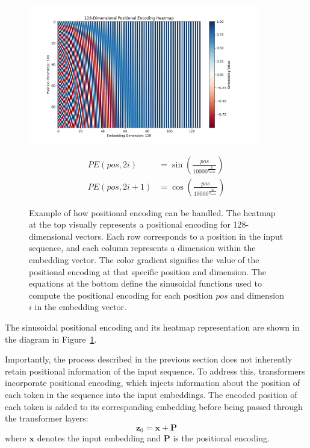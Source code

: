 \documentclass{pracalicmgr}
\begin{document}
\begin{figure}[H]
    \centering
    \begin{minipage}{\textwidth}
        \centering
        \includegraphics[width=0.9\textwidth]{src/embedings.png}
    \end{minipage}
    \vspace{0.2cm}
    \begin{minipage}{\textwidth}
        \centering
        \begin{align*}
        PE(pos, 2i) &= \sin\left(\frac{pos}{10000^{\frac{2i}{d_{\text{model}}}}}\right) \\
        PE(pos, 2i + 1) &= \cos\left(\frac{pos}{10000^{\frac{2i}{d_{\text{model}}}}}\right)
        \end{align*}
    \end{minipage}
    \label{fig:positionalEncoding}
    \caption{Example of how positional encoding can be handled. The heatmap at the top visually represents a positional encoding for 128-dimensional vectors. Each row corresponds to a position in the input sequence, and each column represents a dimension within the embedding vector. The color gradient signifies the value of the positional encoding at that specific position and dimension. The equations at the bottom define the sinusoidal functions used to compute the positional encoding for each position \( pos \) and dimension \( i \) in the embedding vector.\cite{Kubo2024Transformer}}
\end{figure}

The sinusoidal positional encoding and its heatmap representation are shown in the diagram in Figure~\ref{fig:positionalEncoding}.

Importantly, the process described in the previous section does not inherently retain positional information of the input sequence. To address this, transformers incorporate positional encoding, which injects information about the position of each token in the sequence into the input embeddings. The encoded position of each token is added to its corresponding embedding before being passed through the transformer layers:
\[
\mathbf{z}_0 = \mathbf{x} + \mathbf{P}
\]
where \( \mathbf{x} \) denotes the input embedding and \( \mathbf{P} \) is the positional encoding.
\end{document}
